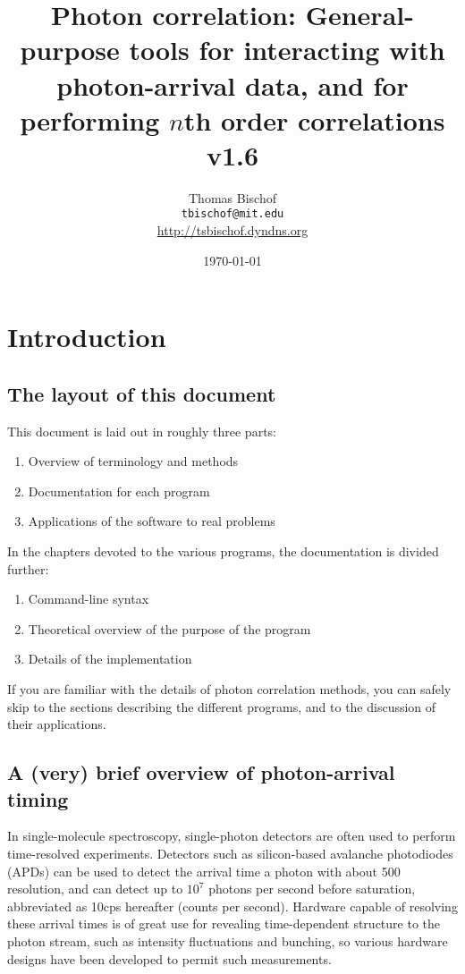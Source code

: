 \documentclass{book}
\title{Photon correlation: General-purpose tools for interacting with photon-arrival data, and for performing $n$th order correlations \\ 
v1.6}
\author{Thomas Bischof \\ \texttt{tbischof@mit.edu} \\ \url{http://tsbischof.dyndns.org}}
\date{\today}
\newcommand{\cps}{\textnormal{cps}}
\numberwithin{equation}{section}
\numberwithin{figure}{section}
\begin{document}
\maketitle
\tableofcontents


\newpage
 
\chapter{Introduction}
\section{The layout of this document}
This document is laid out in roughly three parts:
\begin{enumerate}
\item Overview of terminology and methods
\item Documentation for each program
\item Applications of the software to real problems
\end{enumerate}
In the chapters devoted to the various programs, the documentation is divided further:
\begin{enumerate}
\item Command-line syntax
\item Theoretical overview of the purpose of the program
\item Details of the implementation
\end{enumerate}
If you are familiar with the details of photon correlation methods, you can safely skip to the sections describing the different programs, and to the discussion of their applications. 

\section{A (very) brief overview of photon-arrival timing}
In single-molecule spectroscopy, single-photon detectors are often used to perform time-resolved experiments. Detectors such as silicon-based avalanche photodiodes (APDs) can be used to detect the arrival time a photon with about 500\pico\second{} resolution, and can detect up to $10^{7}$ photons per second before saturation, abbreviated as 10\mega\cps{} hereafter (counts per second). Hardware capable of resolving these arrival times is of great use for revealing time-dependent structure to the photon stream, such as intensity fluctuations and bunching, so various hardware designs have been developed to permit such measurements.
\end{document}
